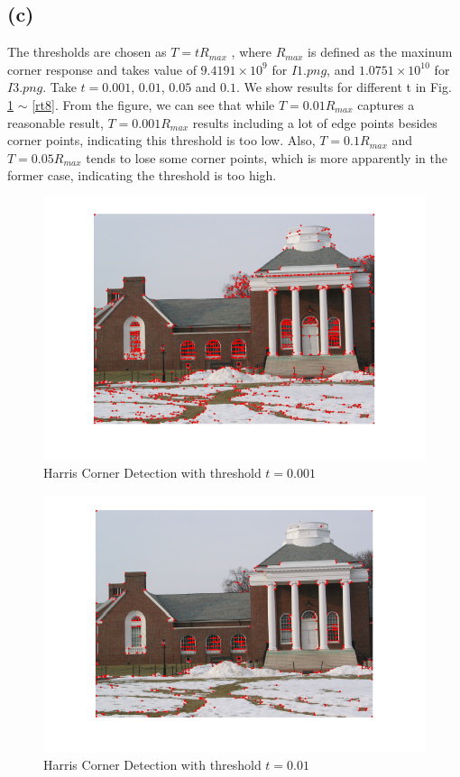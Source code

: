 \documentclass[letterpaper]{article}
\begin{document}
\subsection*{(c)}
The thresholds are chosen as $T = tR_{max}$ , where $R_{max}$ is defined as the maxinum corner response and takes value of $9.4191 \times 10^9$ for $I1.png$, and $1.0751 \times 10^{10}$ for $I3.png$. Take $t = 0.001$, $0.01$, $0.05$ and $0.1$. We show results for different t in Fig. \ref{tr1} $\sim$ \ref{rt8}. From the figure, we can see that while $T = 0.01 R_{max}$ captures a reasonable result, $T = 0.001R_{max}$ results including a lot of edge points besides corner points, indicating this threshold is too low. Also, $T = 0.1R_{max}$ and $T = 0.05R_{max}$ tends to lose some corner points, which is more apparently in the former case, indicating the threshold is too high.
\begin{figure}[H]
\centering
\includegraphics[scale=0.7]{I1t0001.png}
\caption{Harris Corner Detection with threshold $t = 0.001$}
\label{tr1}
\end{figure}
\begin{figure}[H]
\centering
\includegraphics[scale=0.7]{I1t001.png}
\caption{Harris Corner Detection with threshold $t = 0.01$}
\label{tr2}
\end{figure}
\end{document}
